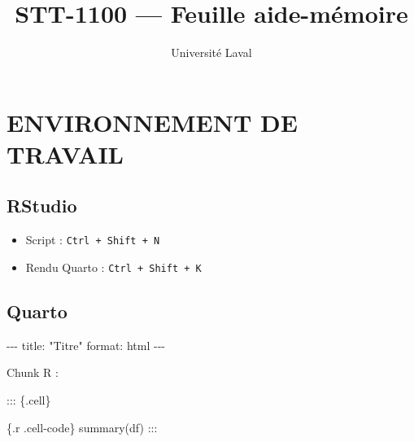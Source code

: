 \documentclass[
  french,
  8pt,
  letterpaper,
  DIV=11,
  numbers=noendperiod]{scrartcl}
\title{STT-1100 --- Feuille aide-mémoire}
\author{Université Laval}
\date{}
\newenvironment{Shaded}{\begin{snugshade}}{\end{snugshade}}
\newcommand{\AnnotationTok}[1]{\textcolor[rgb]{0.37,0.37,0.37}{#1}}
\newcommand{\AttributeTok}[1]{\textcolor[rgb]{0.40,0.45,0.13}{#1}}
\newcommand{\CommentTok}[1]{\textcolor[rgb]{0.37,0.37,0.37}{#1}}
\newcommand{\ConstantTok}[1]{\textcolor[rgb]{0.56,0.35,0.01}{#1}}
\newcommand{\FunctionTok}[1]{\textcolor[rgb]{0.28,0.35,0.67}{#1}}
\newcommand{\NormalTok}[1]{\textcolor[rgb]{0.00,0.23,0.31}{#1}}
\newcommand{\SpecialCharTok}[1]{\textcolor[rgb]{0.37,0.37,0.37}{#1}}
\newcommand{\StringTok}[1]{\textcolor[rgb]{0.13,0.47,0.30}{#1}}
\providecommand{\tightlist}{%
  \setlength{\itemsep}{0pt}\setlength{\parskip}{0pt}}
\begin{document}
\maketitle


\begin{Shaded}
\end{Shaded}

\section{ ENVIRONNEMENT DE TRAVAIL}\label{environnement-de-travail}

\subsection{RStudio}\label{rstudio}

\begin{itemize}
\tightlist
\item
  Script : \texttt{Ctrl\ +\ Shift\ +\ N}
\item
  Rendu Quarto : \texttt{Ctrl\ +\ Shift\ +\ K}
\end{itemize}

\subsection{Quarto}\label{quarto}

\begin{Shaded}
\begin{Highlighting}[]
\CommentTok{{-}{-}{-}}
\AnnotationTok{title:}\CommentTok{ "Titre"}
\AnnotationTok{format:}\CommentTok{ html}
\CommentTok{{-}{-}{-}}
\end{Highlighting}
\end{Shaded}

Chunk R :

\begin{Shaded}
\begin{Highlighting}[]

\SpecialCharTok{:::}\NormalTok{ \{.cell\}}

\StringTok{\textasciigrave{}\textasciigrave{}\textasciigrave{}}\AttributeTok{\{.r .cell{-}code\}}
\AttributeTok{summary(df)}
\StringTok{\textasciigrave{}\textasciigrave{}\textasciigrave{}}
\SpecialCharTok{:::}
\end{Highlighting}
\end{Shaded}
\end{document}
